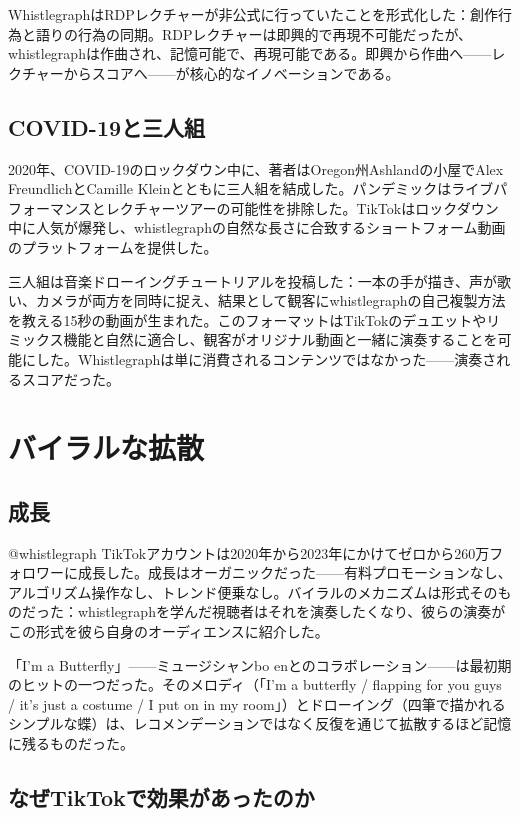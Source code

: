 \documentclass[10pt,letterpaper,twocolumn]{article}
\begin{document}
WhistlegraphはRDPレクチャーが非公式に行っていたことを形式化した：創作行為と語りの行為の同期。RDPレクチャーは即興的で再現不可能だったが、whistlegraphは作曲され、記憶可能で、再現可能である。即興から作曲へ——レクチャーからスコアへ——が核心的なイノベーションである。

\subsection{COVID-19と三人組}

2020年、COVID-19のロックダウン中に、著者はOregon州Ashlandの小屋でAlex FreundlichとCamille Kleinとともに三人組を結成した。パンデミックはライブパフォーマンスとレクチャーツアーの可能性を排除した。TikTokはロックダウン中に人気が爆発し、whistlegraphの自然な長さに合致するショートフォーム動画のプラットフォームを提供した。

三人組は音楽ドローイングチュートリアルを投稿した：一本の手が描き、声が歌い、カメラが両方を同時に捉え、結果として観客にwhistlegraphの自己複製方法を教える15秒の動画が生まれた。このフォーマットはTikTokのデュエットやリミックス機能と自然に適合し、観客がオリジナル動画と一緒に演奏することを可能にした。Whistlegraphは単に消費されるコンテンツではなかった——演奏されるスコアだった。

\section{バイラルな拡散}

\subsection{成長}

@whistlegraph TikTokアカウントは2020年から2023年にかけてゼロから260万フォロワーに成長した。成長はオーガニックだった——有料プロモーションなし、アルゴリズム操作なし、トレンド便乗なし。バイラルのメカニズムは形式そのものだった：whistlegraphを学んだ視聴者はそれを演奏したくなり、彼らの演奏がこの形式を彼ら自身のオーディエンスに紹介した。

「I'm a Butterfly」——ミュージシャンbo enとのコラボレーション——は最初期のヒットの一つだった。そのメロディ（「I'm a butterfly / flapping for you guys / it's just a costume / I put on in my room」）とドローイング（四筆で描かれるシンプルな蝶）は、レコメンデーションではなく反復を通じて拡散するほど記憶に残るものだった。

\subsection{なぜTikTokで効果があったのか}
\end{document}
